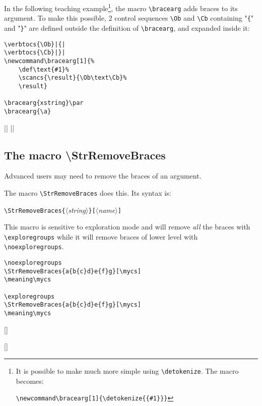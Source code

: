 \documentclass[a4paper,10pt]{article}
\newcommand\argu[1]{$\langle$\textit{#1}$\rangle$}
\newcommand\ARGU[1]{\texttt{\{}\argu{#1}\texttt{\}}}
\newcommand\arguC[1]{\texttt{[}\argu{#1}\texttt{]}}
\newcommand\styleexercice{\footnotesize}
\newcommand\verbinline{\lstinline[basicstyle=\normalsize\ttfamily]}
\begin{document}
In the following teaching example\footnote{It is possible to make much more simple using \texttt{\textbackslash detokenize}. The macro becomes:\par\texttt{\textbackslash newcommand\textbackslash bracearg[1]\{\textbackslash detokenize\{\{\#1\}\}\}}}, the macro \verb|\bracearg| adds braces to its argument. To make this possible, 2 control sequences \verb|\Ob| and \verb|\Cb| containing "\verb|{|" and "\verb|}|" are defined outside the definition of \verb|\bracearg|, and expanded inside it:\par\nobreak\medskip
\begin{minipage}[c]{0.65\linewidth}
\begin{lstlisting}
\verbtocs{\Ob}|{|
\verbtocs{\Cb}|}|
\newcommand\bracearg[1]{%
	\def\text{#1}%
	\scancs{\result}{\Ob\text\Cb}%
	\result}

\bracearg{xstring}\par
\bracearg{\a}
\end{lstlisting}%
\end{minipage}\hfill
\begin{minipage}[c]{0.35\linewidth}
	\styleexercice
	\verbtocs{\Ob}|{|
	\verbtocs{\Cb}|}|
	\newcommand\bracearg[1]{%
		\def\text{#1}%
		\scancs{\result}{\Ob\text\Cb}%
		\result}

	\bracearg{xstring}\par
	\bracearg{\a}
\end{minipage}%

\subsection{The macro \ttfamily\textbackslash StrRemoveBraces}
Advanced users may need to remove the braces of an argument.

The macro \verbinline|\StrRemoveBraces| does this. Its syntax is:\smallskip

\verbinline|\StrRemoveBraces|\ARGU{string}\arguC{name}
\smallskip

This macro is sensitive to exploration mode and will remove \emph{all} the braces with \verbinline|\exploregroups| while it will remove braces of lower level with \verbinline|\noexploregroups|.\medskip

\begin{minipage}[c]{0.65\linewidth}
\begin{lstlisting}
\noexploregroups
\StrRemoveBraces{a{b{c}d}e{f}g}[\mycs]
\meaning\mycs

\exploregroups
\StrRemoveBraces{a{b{c}d}e{f}g}[\mycs]
\meaning\mycs
\end{lstlisting}%
\end{minipage}\hfill
\begin{minipage}[c]{0.35\linewidth}
	\styleexercice
	\noexploregroups
	[\mycs]
	\meaning\mycs

	\exploregroups
	[\mycs]
	\meaning\mycs
\end{minipage}%
\end{document}
